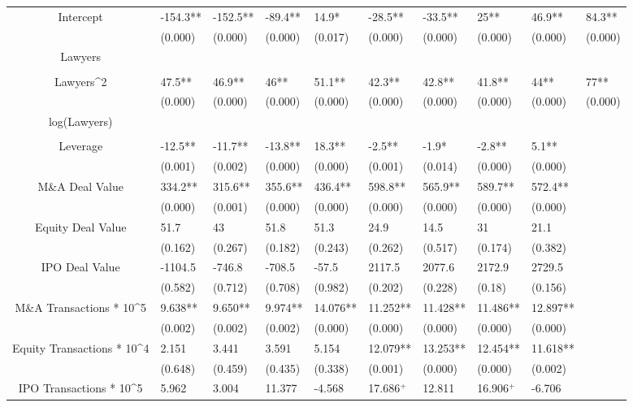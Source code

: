\documentclass{article}
\begin{document}
\begin{table}[H]
\begin{tabular}{|clllllllll|}
Intercept & -154.3** & -152.5** & -89.4** & 14.9* & -28.5** & -33.5** & 25** & 46.9** & 84.3** \\
   & (0.000) & (0.000) & (0.000) & (0.017) & (0.000) & (0.000) & (0.000) & (0.000) & (0.000) \\
  Lawyers &  &  &  &  &  &  &  &  &  \\
   &  &  &  &  &  &  &  &  &  \\
  Lawyers^2 & 47.5** & 46.9** & 46** & 51.1** & 42.3** & 42.8** & 41.8** & 44** & 77** \\
   & (0.000) & (0.000) & (0.000) & (0.000) & (0.000) & (0.000) & (0.000) & (0.000) & (0.000) \\
  log(Lawyers) &  &  &  &  &  &  &  &  &  \\
   &  &  &  &  &  &  &  &  &  \\
  Leverage & -12.5** & -11.7** & -13.8** & 18.3** & -2.5** & -1.9* & -2.8** & 5.1** &  \\
   & (0.001) & (0.002) & (0.000) & (0.000) & (0.001) & (0.014) & (0.000) & (0.000) &  \\
  M\&A Deal Value & 334.2** & 315.6** & 355.6** & 436.4** & 598.8** & 565.9** & 589.7** & 572.4** &  \\
   & (0.000) & (0.001) & (0.000) & (0.000) & (0.000) & (0.000) & (0.000) & (0.000) &  \\
  Equity Deal Value & 51.7 & 43 & 51.8 & 51.3 & 24.9 & 14.5 & 31 & 21.1 &  \\
   & (0.162) & (0.267) & (0.182) & (0.243) & (0.262) & (0.517) & (0.174) & (0.382) &  \\
  IPO Deal Value & -1104.5 & -746.8 & -708.5 & -57.5 & 2117.5 & 2077.6 & 2172.9 & 2729.5 &  \\
   & (0.582) & (0.712) & (0.708) & (0.982) & (0.202) & (0.228) & (0.18) & (0.156) &  \\
  M\&A Transactions * 10^5 & 9.638** & 9.650** & 9.974** & 14.076** & 11.252** & 11.428** & 11.486** & 12.897** &  \\
   & (0.002) & (0.002) & (0.002) & (0.000) & (0.000) & (0.000) & (0.000) & (0.000) &  \\
  Equity Transactions * 10^4 & 2.151 & 3.441 & 3.591 & 5.154 & 12.079** & 13.253** & 12.454** & 11.618** &  \\
   & (0.648) & (0.459) & (0.435) & (0.338) & (0.001) & (0.000) & (0.000) & (0.002) &  \\
  IPO Transactions * 10^5 & 5.962 & 3.004 & 11.377 & -4.568 & 17.686$^{+}$ & 12.811 & 16.906$^{+}$ & -6.706 &  \\

\end{tabular}
\end{table}
\end{document}
